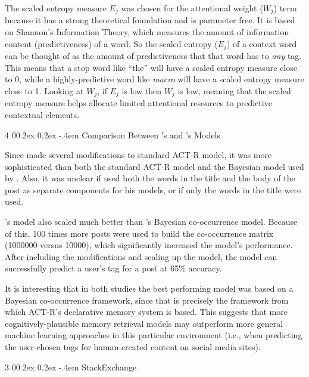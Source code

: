 \documentclass[man,floatsintext,donotrepeattitle]{apa6}
\makeatletter
\renewcommand{\subsubsection}{%
  \@startsection
  {subsubsection}%
  {3}%
  {\parindent}%
  {0\baselineskip \@plus 0.2ex \@minus 0.2ex}%
  {-.4em}%
  {\normalfont\normalsize\bfseries\addperi}}
\renewcommand{\paragraph}{%
  \@startsection
  {paragraph}%
  {4}%
  {\parindent}%
  {0\baselineskip \@plus 0.2ex \@minus 0.2ex}%
  {-.4em}%
  {\normalfont\normalsize\bfseries\itshape\addperi}}
\makeatother
\begin{document}
The scaled entropy measure $E_{j}$ was chosen for the attentional weight ($W_{j}$) term because it has a strong theoretical foundation \parencite{Dumais1991} and is parameter free.
It is based on Shannon's Information Theory, which measures the amount of information content (predictiveness) of a word.
So the scaled entropy ($E_{j}$) of a context word can be thought of as the amount of predictiveness that that word has to \emph{any} tag.
This means that a stop word like ``the'' will have a scaled entropy measure close to 0, while a highly-predictive word like \emph{macro} will have a scaled entropy measure close to 1.
Looking at $W_{j}$, if $E_{j}$ is low then $W_{j}$ is low, meaning that the scaled entropy measure helps allocate limited attentional resources to predictive contextual elements.

\paragraph{Comparison Between \citeauthor{Kuo2011}'s and \citeauthor{Stanley2013}'s Models}

Since \textcite{Stanley2013} made several modifications to standard ACT-R model, it was more sophisticated than both the standard ACT-R model and the Bayesian model used by \textcite{Kuo2011}.
Also, it was unclear if \citeauthor{Kuo2011} used both the words in the title and the body of the post as separate components for his models, or if only the words in the title were used.

\citeauthor{Stanley2013}'s model also scaled much better than \citeauthor{Kuo2011}'s Bayesian co-occurrence model. 
Because of this, 100 times more posts were used to build the co-occurrence matrix (\num{1000000} versus \num{10000}), which significantly increased the model's performance.
After including the modifications and scaling up the model, the model can successfully predict a user's tag for a post at 65\% accuracy.

It is interesting that in both studies the best performing model was based on a Bayesian co-occurrence framework, since that is precisely the framework from which ACT-R's declarative memory system is based.
This suggests that more cognitively-plausible memory retrieval models may outperform more general machine learning approaches in this particular environment
(i.e., when predicting the user-chosen tags for human-created content on social media sites).

\subsubsection{StackExchange}
\end{document}
